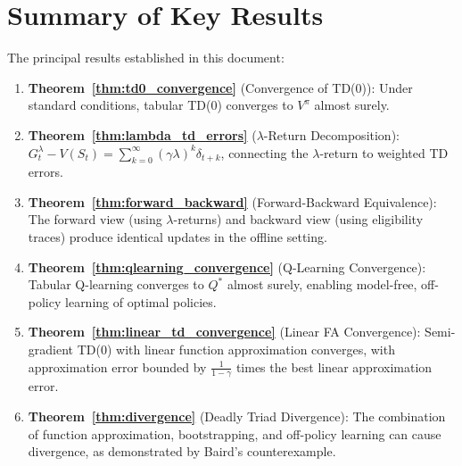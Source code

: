 \documentclass[11pt,a4paper]{article}
\theoremstyle{definition}
\theoremstyle{plain}
\theoremstyle{remark}
\begin{document}
\section{Summary of Key Results}
\label{sec:summary}

\begin{keyresult}
The principal results established in this document:

\begin{enumerate}
    \item \textbf{Theorem~\ref{thm:td0_convergence}} (Convergence of TD(0)): Under standard conditions, tabular TD(0) converges to $V^\pi$ almost surely.

    \item \textbf{Theorem~\ref{thm:lambda_td_errors}} ($\lambda$-Return Decomposition): $G_t^\lambda - V(S_t) = \sum_{k=0}^{\infty}(\gamma\lambda)^k \delta_{t+k}$, connecting the $\lambda$-return to weighted TD errors.

    \item \textbf{Theorem~\ref{thm:forward_backward}} (Forward-Backward Equivalence): The forward view (using $\lambda$-returns) and backward view (using eligibility traces) produce identical updates in the offline setting.

    \item \textbf{Theorem~\ref{thm:qlearning_convergence}} (Q-Learning Convergence): Tabular Q-learning converges to $Q^*$ almost surely, enabling model-free, off-policy learning of optimal policies.

    \item \textbf{Theorem~\ref{thm:linear_td_convergence}} (Linear FA Convergence): Semi-gradient TD(0) with linear function approximation converges, with approximation error bounded by $\frac{1}{1-\gamma}$ times the best linear approximation error.

    \item \textbf{Theorem~\ref{thm:divergence}} (Deadly Triad Divergence): The combination of function approximation, bootstrapping, and off-policy learning can cause divergence, as demonstrated by Baird's counterexample.
\end{enumerate}
\end{keyresult}

\end{document}
